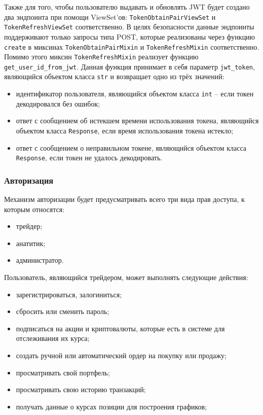 Также для того, чтобы пользователю выдавать и обновлять JWT будет создано два эндпоинта при помощи ViewSet'ов:
\lstinline{TokenObtainPairViewSet} и \lstinline{TokenRefreshViewSet} соответственно.
В целях безопасности данные эндпоинты поддерживают только запросы типа POST, которые реализованы через функцию \lstinline{create} в
миксинах \lstinline{TokenObtainPairMixin} и \lstinline{TokenRefreshMixin} соответственно.
Помимо этого миксин \lstinline{TokenRefreshMixin} реализует функцию \lstinline{get_user_id_from_jwt}.
Данная функция принимает в себя параметр \lstinline{jwt_token}, являющийся объектом класса \lstinline{str}
и возвращает одно из трёх значений:
\begin{itemize}
    \item идентификатор пользователя, являющийся объектом класса \lstinline{int} -- если токен декодировался без ошибок;
    \item ответ с сообщением об истекшем времени использования токена, являющийся объектом класса \lstinline{Response}, если время использования токена истекло;
    \item ответ с сообщением о неправильном токене, являющийся объектом класса \lstinline{Response}, если токен не удалось декодировать.
\end{itemize}


\subsubsection{Авторизация}
Механизм авторизации будет предусматривать всего три вида прав доступа, к которым относятся:
\begin{itemize}
    \item трейдер;
    \item анатитик;
    \item администратор.
\end{itemize}

Пользователь, являющийся трейдером, может выполнять следующие действия:
\begin{itemize}
    \item зарегистрироваться, залогиниться;
    \item сбросить или сменить пароль;
    \item подписаться на акции и криптовалюты, которые есть в системе для отслеживания их курса;
    \item создать ручной или автоматический ордер на покупку или продажу;
    \item просматривать свой портфель;
    \item просматривать свою историю транзакций;
    \item получать данные о курсах позиции для построения графиков;
\end{itemize}

